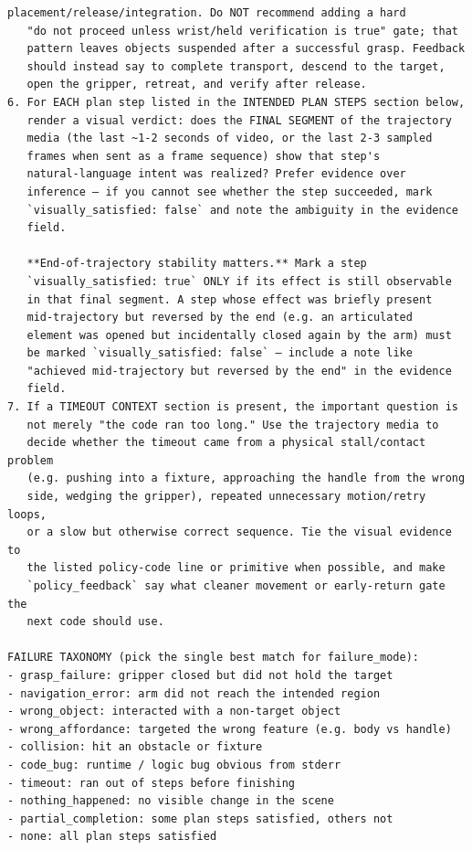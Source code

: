 \documentclass{llmxive}
\begin{document}
\begin{lstlisting}[style=ratsappendixprompt]
   placement/release/integration. Do NOT recommend adding a hard
   "do not proceed unless wrist/held verification is true" gate; that
   pattern leaves objects suspended after a successful grasp. Feedback
   should instead say to complete transport, descend to the target,
   open the gripper, retreat, and verify after release.
6. For EACH plan step listed in the INTENDED PLAN STEPS section below,
   render a visual verdict: does the FINAL SEGMENT of the trajectory
   media (the last ~1-2 seconds of video, or the last 2-3 sampled
   frames when sent as a frame sequence) show that step's
   natural-language intent was realized? Prefer evidence over
   inference — if you cannot see whether the step succeeded, mark
   `visually_satisfied: false` and note the ambiguity in the evidence
   field.

   **End-of-trajectory stability matters.** Mark a step
   `visually_satisfied: true` ONLY if its effect is still observable
   in that final segment. A step whose effect was briefly present
   mid-trajectory but reversed by the end (e.g. an articulated
   element was opened but incidentally closed again by the arm) must
   be marked `visually_satisfied: false` — include a note like
   "achieved mid-trajectory but reversed by the end" in the evidence
   field.
7. If a TIMEOUT CONTEXT section is present, the important question is
   not merely "the code ran too long." Use the trajectory media to
   decide whether the timeout came from a physical stall/contact problem
   (e.g. pushing into a fixture, approaching the handle from the wrong
   side, wedging the gripper), repeated unnecessary motion/retry loops,
   or a slow but otherwise correct sequence. Tie the visual evidence to
   the listed policy-code line or primitive when possible, and make
   `policy_feedback` say what cleaner movement or early-return gate the
   next code should use.

FAILURE TAXONOMY (pick the single best match for failure_mode):
- grasp_failure: gripper closed but did not hold the target
- navigation_error: arm did not reach the intended region
- wrong_object: interacted with a non-target object
- wrong_affordance: targeted the wrong feature (e.g. body vs handle)
- collision: hit an obstacle or fixture
- code_bug: runtime / logic bug obvious from stderr
- timeout: ran out of steps before finishing
- nothing_happened: no visible change in the scene
- partial_completion: some plan steps satisfied, others not
- none: all plan steps satisfied


\end{lstlisting}
\end{document}
